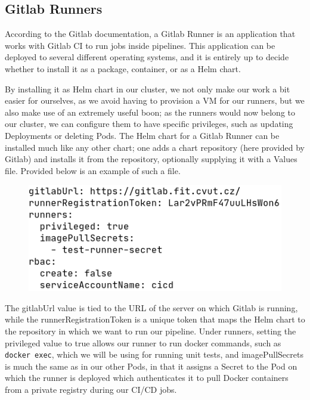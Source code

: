 \documentclass[thesis=B,english]{FITthesis}[2019/12/23]
\begin{document}
\subsection{Gitlab Runners}

According to the Gitlab documentation, a Gitlab Runner is an application that works with Gitlab CI to run jobs inside pipelines. This application can be deployed to several different operating systems, and it is entirely up to decide whether to install it as a package, container, or as a Helm chart.

By installing it as Helm chart in our cluster, we not only make our work a bit easier for ourselves, as we avoid having to provision a VM for our runners, but we also make use of an extremely useful boon; as the runners would now belong to our cluster, we can configure them to have specific privileges, such as updating Deployments or deleting Pods. The Helm chart for a Gitlab Runner can be installed much like any other chart; one adds a chart repository (here provided by Gitlab) and installs it from the repository, optionally supplying it with a Values file. Provided below is an example of such a file.

\begin{figure}[H]
\centering
\hspace*{-0.6cm}
\includegraphics[scale=0.5]{runner-values}
\end{figure}

The gitlabUrl value is tied to the URL of the server on which Gitlab is running, while the runnerRegistrationToken is a unique token that maps the Helm chart to the repository in which we want to run our pipeline. Under runners, setting the privileged value to true allows our runner to run docker commands, such as \verb|docker exec|, which we will be using for running unit tests, and imagePullSecrets is much the same as in our other Pods, in that it assigns a Secret to the Pod on which the runner is deployed which authenticates it to pull Docker containers from a private registry during our CI/CD jobs.
\end{document}
